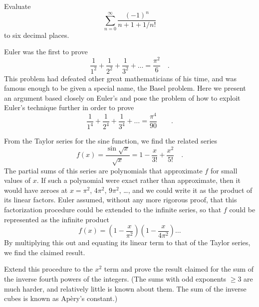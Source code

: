 \begin{hwsection}
\begin{hw}[2]
Evaluate
\begin{equation*}
  \sum_{n=0}^\infty \frac{(-1)^n}{n+1+1/n!}
\end{equation*}
to six decimal places.
\end{hw}

\begin{hw}[2]\label{hw:basel-problem}
Euler was the first to prove
\begin{equation*}
  \frac{1}{1^2}+\frac{1}{2^2}+\frac{1}{3^2}+\ldots=\frac{\pi^2}{6} \quad .
\end{equation*}
This problem had defeated
other great mathematicians of his time, and was famous enough to be given a special name,
the Basel problem. Here we present an argument based closely on Euler's
and pose the problem of how to exploit Euler's technique further in order to prove
\begin{equation*}
  \frac{1}{1^4}+\frac{1}{2^4}+\frac{1}{3^4}+\ldots = \frac{\pi^4}{90} \qquad .
\end{equation*}

From the Taylor series for the sine function, we find the related series
\begin{equation*}
  f(x) = \frac{\sin\sqrt{x}}{\sqrt{x}} = 1 - \frac{x}{3!} + \frac{x^2}{5!} \quad .
\end{equation*}
The partial sums of this series are polynomials that approximate $f$ for small values of $x$.
If such a polynomial were exact rather than approximate, then it would have zeroes at $x=\pi^2$,
$4\pi^2$, $9\pi^2$, \ldots, and we could write it as the product of its linear factors. Euler assumed, without
any more rigorous proof, that this factorization procedure could be extended to the infinite series,
so that $f$ could be represented as the infinite product
\begin{equation*}
  f(x) = \left(1-\frac{x}{\pi^2}\right)\left(1-\frac{x}{4\pi^2}\right)\ldots
\end{equation*}
By multiplying this out and equating its linear term to that of the Taylor series, we find the claimed
result.

Extend this procedure to the $x^2$ term and prove the result claimed for the sum of the inverse
fourth powers of the integers. (The sums with odd exponents $\ge 3$ are much harder, and relatively
little is known about them. The sum of the inverse cubes is known as Ap\`ery's constant.)
\end{hw}


\end{hwsection}
